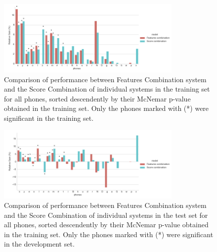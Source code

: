 \begin{figure}[H]
	\centering
	\includegraphics[width=0.8\textwidth]{files/figures/results/relatives/relatives-fusion-systems-dev-all.png}
	\caption{Comparison of performance between Features Combination system and the Score Combination
	of individual systems in the training set for all phones, sorted descendently by their 
	McNemar p-value obtained in the training set. Only the phones marked with (*) were significant in the training set.}
	\label{fig:fusionAllDev}
\end{figure}

\begin{figure}[H]
	\centering
	\includegraphics[width=0.8\textwidth]{files/figures/results/relatives/relative-fusion-systems-heldout-all.png}
	\caption{Comparison of performance between Features Combination system and the Score Combination
	of individual systems in the test set for all phones, sorted descendently by their McNemar
	p-value obtained in the training set. Only the phones marked with (*) were significant in the development set.}
	\label{fig:fusionAllHeldout}
\end{figure}
